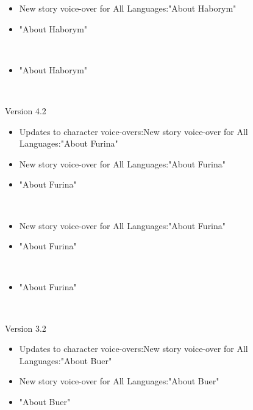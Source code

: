 \documentclass[a4paper,12pt]{article}
\begin{document}
\begin{itemize}
\item New story voice-over for All Languages:"About Haborym"
\item "About Haborym"
\end{itemize}\\ \par \vspace{0.5cm}

\begin{itemize}
\item "About Haborym"
\end{itemize}\\ \par \vspace{0.5cm}

Version 4.2\\ \par \vspace{0.5cm}

\begin{itemize}
\item Updates to character voice-overs:New story voice-over for All Languages:"About Furina"
\item New story voice-over for All Languages:"About Furina"
\item "About Furina"
\end{itemize}\\ \par \vspace{0.5cm}

\begin{itemize}
\item New story voice-over for All Languages:"About Furina"
\item "About Furina"
\end{itemize}\\ \par \vspace{0.5cm}

\begin{itemize}
\item "About Furina"
\end{itemize}\\ \par \vspace{0.5cm}

Version 3.2\\ \par \vspace{0.5cm}

\begin{itemize}
\item Updates to character voice-overs:New story voice-over for All Languages:"About Buer"
\item New story voice-over for All Languages:"About Buer"
\item "About Buer"
\end{itemize}\\ \par \vspace{0.5cm}
\end{document}

